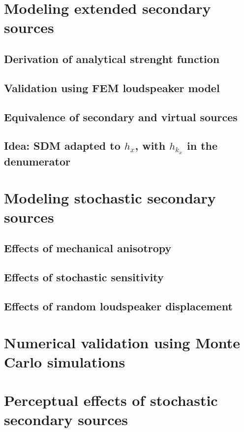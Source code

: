 \section{Modeling extended secondary sources}
%
\subsection{Derivation of analytical strenght function}
\subsection{Validation using FEM loudspeaker model}
\subsection{Equivalence of secondary and virtual sources}
\subsection{Idea: SDM adapted to $h_x$, with $h_{k_x}$ in the denumerator}
%
%
\section{Modeling stochastic secondary sources}

\subsection{Effects of mechanical anisotropy}
\subsection{Effects of stochastic sensitivity}
\subsection{Effects of random loudspeaker displacement}

\section{Numerical validation using Monte Carlo simulations}

\section{Perceptual effects of stochastic secondary sources}